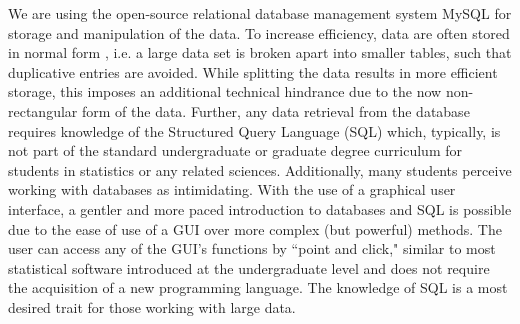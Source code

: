 \documentclass[11pt]{tise_style}
\begin{document}
We are using the open-source relational database management system MySQL \citep{mysql} for storage and manipulation of the data. To increase efficiency, data are often stored in normal form \citep{normalform:1983}, i.e. a large data set is broken apart into smaller  tables, such that duplicative entries are avoided. While splitting the data results in  more efficient storage, this imposes an additional technical hindrance due to the now non-rectangular form of the data. Further, any data retrieval from the database requires knowledge of the Structured Query Language (SQL) which, typically, is not part of the standard undergraduate or graduate degree curriculum for students in statistics or any related sciences. Additionally, many students perceive working with databases as intimidating. With the use of a graphical user interface, a gentler and more paced introduction to databases and SQL is possible due to the ease of use of a GUI over more complex (but powerful) methods.  The user can access any of the GUI's functions by ``point and click," similar to most statistical software introduced at the undergraduate level and does not require the acquisition of a new programming language.  The knowledge of SQL is a most desired trait for those working with large data.
\end{document}

